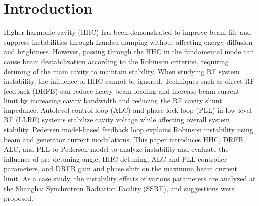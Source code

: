 \documentclass[letterpaper,
               nospread,     %
               ]{jacow}
\begin{document}
\section{Introduction}
Higher harmonic cavity (HHC) has been demonstrated to improve beam life and suppress instabilities through Landau damping without affecting energy diffusion and brightness\cite{ref1}\cite{ref2}. However, passing through the HHC in the fundamental mode can cause beam destabilization according to the Robinson criterion, requiring detuning of the main cavity to maintain stability\cite{ref3}. When studying RF system instability, the influence of HHC cannot be ignored. Techniques such as direct RF feedback (DRFB) can reduce heavy beam loading and increase beam current limit by increasing cavity bandwidth and reducing the RF cavity shunt impedance\cite{ref4}. Autolevel control loop (ALC) and phase lock loop (PLL) in low-level RF (LLRF) systems stabilize cavity voltage while affecting overall system stability. Pedersen model-based feedback loop explains Robinson instability using beam and generator current modulations\cite{ref5}\cite{ref6}. This paper introduces HHC, DRFB, ALC, and PLL to Pedersen model to analyze instability and evaluate the influence of pre-detuning angle, HHC detuning, ALC and PLL controller parameters, and DRFB gain and phase shift on the maximum beam current limit. As a case study, the instability effects of various parameters are analyzed at the Shanghai Synchrotron Radiation Facility (SSRF), and suggestions were proposed.
\end{document}
